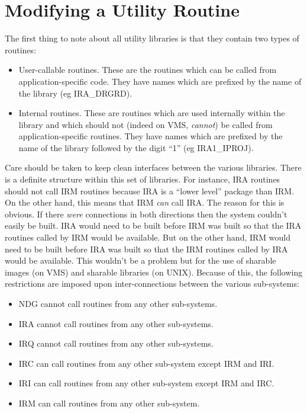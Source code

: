 \section{Modifying a Utility Routine}
\label{SEC:UT}
The first thing to note about all utility libraries is that they contain two
types of routines:
\begin{itemize}
\item User-callable routines. These are the routines which can be called from
application-specific code. They have names which are prefixed by the name of the
library (eg {\small IRA\_DRGRD}).
\item Internal routines. These are routines which are used internally within
the library and which should not (indeed on {\small VMS}, {\em cannot}) be
called from application-specific routines. They have names which are prefixed by the name of the
library followed by the digit ``1'' (eg {\small IRA1\_IPROJ}).
\end{itemize}

Care should be taken to keep clean interfaces between the various libraries.
There is a definite structure within this set of libraries. For instance,
{\small IRA} routines should not call {\small IRM} routines because {\small IRA}
is a ``lower level'' package than {\small IRM}. On the other hand, this means
that {\small IRM} {\em can} call {\small IRA}. The reason for this is obvious.
If there {\em were} connections in both directions then the system couldn't
easily be built. {\small IRA} would need to be built before {\small IRM} was
built so that the {\small IRA} routines called by {\small IRM} would be
available. But on the other hand, {\small IRM} would need to be built before
{\small IRA} was built so that the {\small IRM} routines called by {\small IRA}
would be available. This wouldn't be a problem but for the use of sharable
images (on {\small VMS}) and sharable libraries (on {\small UNIX}). Because of
this, the following restrictions are imposed upon inter-connections between the
various sub-systems:

\begin{itemize}
\item {\small NDG} cannot call routines from any other sub-systems.
\item {\small IRA} cannot call routines from any other sub-systems.
\item {\small IRQ} cannot call routines from any other sub-systems.
\item {\small IRC} can call routines from any other sub-system except {\small
IRM} and {\small IRI}.
\item {\small IRI} can call routines from any other sub-system except {\small
IRM} and {\small IRC}.
\item {\small IRM} can call routines from any other sub-system.
\end{itemize}

